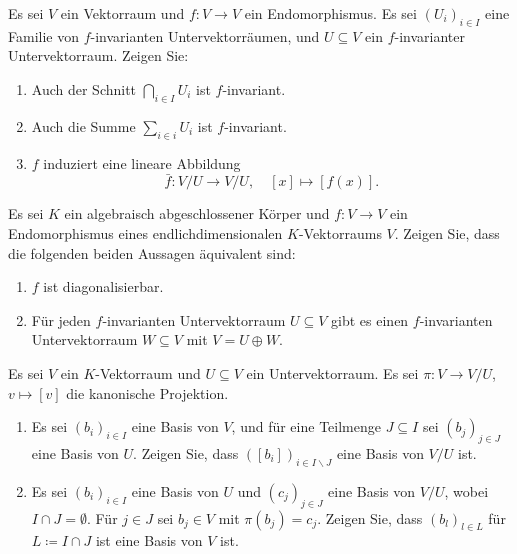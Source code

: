\documentclass[a4paper,10pt]{article}
\begin{document}
\begin{question}
  Es sei $V$ ein Vektorraum und $f \colon V \to V$ ein Endomorphismus.
  Es sei $(U_i)_{i \in I}$ eine Familie von $f$-invarianten Untervektorräumen, und $U \subseteq V$ ein $f$-invarianter Untervektorraum.
  Zeigen Sie:
  \begin{enumerate}[leftmargin=*]
    \item
      Auch der Schnitt $\bigcap_{i \in I} U_i$ ist $f$-invariant.
    \item
      Auch die Summe $\sum_{i \in i} U_i$ ist $f$-invariant.
    \item
      $f$ induziert eine lineare Abbildung
      \[
        \bar{f} \colon V/U \to V/U,
        \quad
        [x] \mapsto [f(x)].
      \]
  \end{enumerate}
\end{question}


\begin{question}
  Es sei $K$ ein algebraisch abgeschlossener Körper und $f \colon V \to V$ ein Endomorphismus eines endlichdimensionalen $K$-Vektorraums $V$.
  Zeigen Sie, dass die folgenden beiden Aussagen äquivalent sind:
  \begin{enumerate}
    \item
      $f$ ist diagonalisierbar.
    \item
      Für jeden $f$-invarianten Untervektorraum $U \subseteq V$ gibt es einen $f$-invarianten Untervektorraum $W \subseteq V$ mit $V = U \oplus W$.
  \end{enumerate}
\end{question}


\begin{question}
  Es sei $V$ ein $K$-Vektorraum und $U \subseteq V$ ein Untervektorraum.
  Es sei $\pi \colon V \to V/U$, $v \mapsto [v]$ die kanonische Projektion.
  \begin{enumerate}[leftmargin=*]
    \item
      Es sei $(b_i)_{i \in I}$ eine Basis von $V$, und für eine Teilmenge $J \subseteq I$ sei $(b_j)_{j \in J}$ eine Basis von $U$.
      Zeigen Sie, dass $([b_i])_{i \in I \smallsetminus J}$ eine Basis von $V/U$ ist.
    \item
      Es sei $(b_i)_{i \in I}$ eine Basis von $U$ und $(c_j)_{j \in J}$ eine Basis von $V/U$, wobei $I \cap J = \emptyset$.
      Für $j \in J$ sei $b_j \in V$ mit $\pi(b_j) = c_j$.
      Zeigen Sie, dass $(b_l)_{l \in L}$ für $L \coloneqq I \cap J$ ist eine Basis von $V$ ist.
  \end{enumerate}
\end{question}
\end{document}
